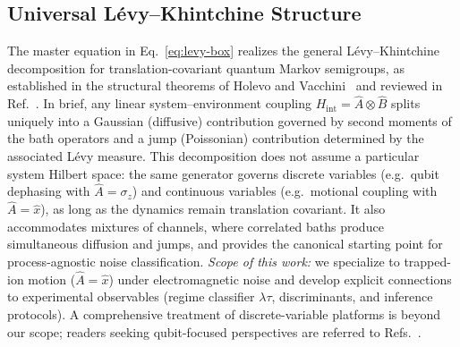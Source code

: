 \subsection{Universal L\'evy--Khintchine Structure}
\label{subsec:universal-LK}
The master equation in Eq.~\eqref{eq:levy-box} realizes the general L\'evy--Khintchine decomposition for translation-covariant quantum Markov semigroups, as established in the structural theorems of Holevo and Vacchini~\cite{Holevo1993,VacchiniJMathPhys2001} and reviewed in Ref.~\cite{BreuerPetruccione2002}.
In brief, any linear system--environment coupling $H_{\text{int}}=\hat{A}\otimes\hat{B}$ splits uniquely into a Gaussian (diffusive) contribution governed by second moments of the bath operators and a jump (Poissonian) contribution determined by the associated L\'evy measure.
This decomposition does not assume a particular system Hilbert space: the same generator governs discrete variables (e.g.~qubit dephasing with $\hat{A}=\sigma_z$) and continuous variables (e.g.~motional coupling with $\hat{A}=\hat{x}$), as long as the dynamics remain translation covariant.
It also accommodates mixtures of channels, where correlated baths produce simultaneous diffusion and jumps, and provides the canonical starting point for process-agnostic noise classification.
\emph{Scope of this work:} we specialize to trapped-ion motion ($\hat{A}=\hat{x}$) under electromagnetic noise and develop explicit connections to experimental observables (regime classifier $\lambda\tau$, discriminants, and inference protocols).
A comprehensive treatment of discrete-variable platforms is beyond our scope; readers seeking qubit-focused perspectives are referred to Refs.~\cite{Paladino2014,Cywinski2008}.

